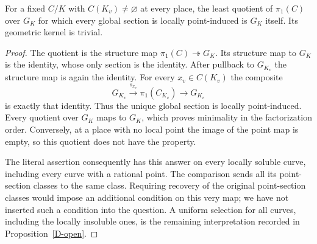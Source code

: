 

\begin{proposition}
\label{D-literal-minimum}
For a fixed $C/K$ with $C(K_v)\ne\varnothing$ at
every place, the least quotient of $\pi_1(C)$
over $G_K$ for which every global section is
locally point-induced is $G_K$ itself.
Its geometric kernel is trivial.
\end{proposition}
\begin{proof}
The quotient is the structure map
$\pi_1(C)\twoheadrightarrow G_K$.
Its structure map to $G_K$ is the identity,
whose only section is the identity. After
pullback to $G_{K_v}$ the structure map is
again the identity. For every $x_v\in C(K_v)$
the composite
\[
 G_{K_v}\xrightarrow{s_{x_v}}\pi_1(C_{K_v})
 \longrightarrow G_{K_v}
\]
is exactly that identity. Thus the unique
global section is locally point-induced.
Every quotient over $G_K$ maps to $G_K$,
which proves minimality in the factorization
order. Conversely, at a place with no
local point the image of the point map
is empty, so this quotient does not have
the property.

The literal assertion consequently has
this answer on every locally soluble
curve, including every curve with a
rational point. The comparison sends
all its point-section classes to the
same class. Requiring recovery of
the original point-section classes
would impose an additional condition
on this very map; we have not inserted
such a condition into the question.
A uniform selection for all curves,
including the locally insoluble ones,
is the remaining interpretation
recorded in Proposition~\ref{D-open}.
\end{proof}


